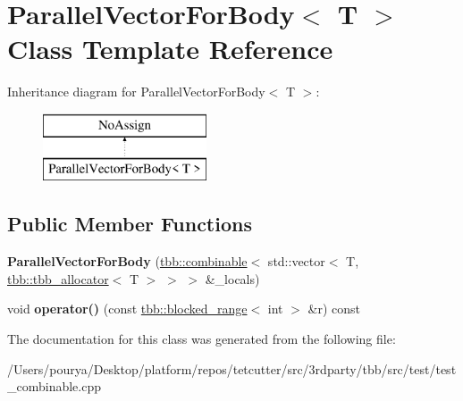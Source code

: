 \hypertarget{classParallelVectorForBody}{}\section{Parallel\+Vector\+For\+Body$<$ T $>$ Class Template Reference}
\label{classParallelVectorForBody}
Inheritance diagram for Parallel\+Vector\+For\+Body$<$ T $>$\+:\begin{figure}[H]
\begin{center}
\leavevmode
\includegraphics[height=2.000000cm]{classParallelVectorForBody}
\end{center}
\end{figure}
\subsection*{Public Member Functions}
\begin{DoxyCompactItemize}
\item 
\hypertarget{classParallelVectorForBody_a0b9a4f86b99c11500145f244608cb6bc}{}{\bfseries Parallel\+Vector\+For\+Body} (\hyperlink{classtbb_1_1combinable}{tbb\+::combinable}$<$ std\+::vector$<$ T, \hyperlink{classtbb_1_1tbb__allocator}{tbb\+::tbb\+\_\+allocator}$<$ T $>$ $>$ $>$ \&\+\_\+locals)\label{classParallelVectorForBody_a0b9a4f86b99c11500145f244608cb6bc}

\item 
\hypertarget{classParallelVectorForBody_a222b1a53d012aacbd8dc66938e484bab}{}void {\bfseries operator()} (const \hyperlink{classtbb_1_1blocked__range}{tbb\+::blocked\+\_\+range}$<$ int $>$ \&r) const \label{classParallelVectorForBody_a222b1a53d012aacbd8dc66938e484bab}

\end{DoxyCompactItemize}


The documentation for this class was generated from the following file\+:\begin{DoxyCompactItemize}
\item 
/\+Users/pourya/\+Desktop/platform/repos/tetcutter/src/3rdparty/tbb/src/test/test\+\_\+combinable.\+cpp\end{DoxyCompactItemize}
